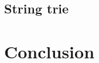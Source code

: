 \documentclass[12pt,final,oneside]{fithesis2}
\theoremstyle{definition}
\begin{document}
\section{String trie}


\chapter{Conclusion}
\label{chap:conclusion}



\renewcommand*{\bibname}{\chapter{Bibliography}\vspace{-1em}}
\end{document}
